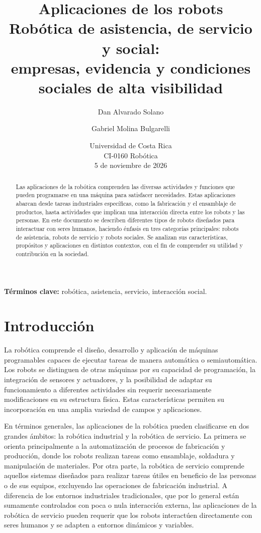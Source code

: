 \documentclass[11pt,a4paper]{article}
\title{\textbf{Aplicaciones de los robots}\\[0.4em]
  \large Robótica de asistencia, de servicio y social:\\
  empresas, evidencia y condiciones sociales de alta visibilidad}
\author{Dan Alvarado Solano \and Gabriel Molina Bulgarelli}
\date{Universidad de Costa Rica\\CI-0160 Robótica\\[0.5em]5 de noviembre de 2026}
\begin{document}
\maketitle
\begin{abstract}
Las aplicaciones de la robótica comprenden las diversas actividades y funciones que pueden programarse en una máquina para satisfacer necesidades. Estas aplicaciones abarcan desde tareas industriales específicas, como la fabricación y el ensamblaje de productos, hasta actividades que implican una interacción directa entre los robots y las personas. En este documento se describen diferentes tipos de robots diseñados para interactuar con seres humanos, haciendo énfasis en tres categorías principales: robots de asistencia, robots de servicio y robots sociales. Se analizan sus características, propósitos y aplicaciones en distintos contextos, con el fin de comprender su utilidad y contribución en la sociedad.
\end{abstract}

\noindent\textbf{Términos clave:} robótica, asistencia, servicio, interacción social.

\section{Introducción}
La robótica comprende el diseño, desarrollo y aplicación de máquinas programables capaces de ejecutar tareas de manera automática o semiautomática. Los robots se distinguen de otras máquinas por su capacidad de programación, la integración de sensores y actuadores, y la posibilidad de adaptar su funcionamiento a diferentes actividades sin requerir necesariamente modificaciones en su estructura física. Estas características permiten su incorporación en una amplia variedad de campos y aplicaciones.\cite{ieeerobots}


En términos generales, las aplicaciones de la robótica pueden clasificarse en dos grandes ámbitos: la robótica industrial y la robótica de servicio. La primera se orienta principalmente a la automatización de procesos de fabricación y producción, donde los robots realizan tareas como ensamblaje, soldadura y manipulación de materiales. Por otra parte, la robótica de servicio comprende aquellos sistemas diseñados para realizar tareas útiles en beneficio de las personas o de sus equipos, excluyendo las operaciones de fabricación industrial. A diferencia de los entornos industriales tradicionales, que por lo general están sumamente controlados con poca o nula interacción externa, las aplicaciones de la robótica de servicio pueden requerir que los robots interactúen directamente con seres humanos y se adapten a entornos dinámicos y variables.\cite{aracil}
\end{document}
